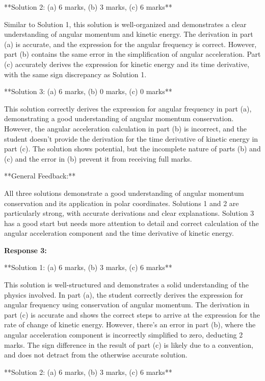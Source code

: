 \documentclass[a4paper,11pt]{article}
\begin{document}
**Solution 2: (a) 6 marks, (b) 3 marks, (c) 6 marks**

Similar to Solution 1, this solution is well-organized and demonstrates a clear understanding of angular momentum and kinetic energy. The derivation in part (a) is accurate, and the expression for the angular frequency is correct. However, part (b) contains the same error in the simplification of angular acceleration. Part (c) accurately derives the expression for kinetic energy and its time derivative, with the same sign discrepancy as Solution 1.

**Solution 3: (a) 6 marks, (b) 0 marks, (c) 0 marks**

This solution correctly derives the expression for angular frequency in part (a), demonstrating a good understanding of angular momentum conservation. However, the angular acceleration calculation in part (b) is incorrect, and the student doesn't provide the derivation for the time derivative of kinetic energy in part (c). The solution shows potential, but the incomplete nature of parts (b) and (c) and the error in (b) prevent it from receiving full marks.

**General Feedback:**

All three solutions demonstrate a good understanding of angular momentum conservation and its application in polar coordinates. Solutions 1 and 2 are particularly strong, with accurate derivations and clear explanations. Solution 3 has a good start but needs more attention to detail and correct calculation of the angular acceleration component and the time derivative of kinetic energy.

\bigskip    
\textbf{Response 3:}

**Solution 1: (a) 6 marks, (b) 3 marks, (c) 6 marks**

This solution is well-structured and demonstrates a solid understanding of the physics involved. In part (a), the student correctly derives the expression for angular frequency using conservation of angular momentum. The derivation in part (c) is accurate and shows the correct steps to arrive at the expression for the rate of change of kinetic energy. However, there's an error in part (b), where the angular acceleration component is incorrectly simplified to zero, deducting 2 marks. The sign difference in the result of part (c) is likely due to a convention, and does not detract from the otherwise accurate solution.

**Solution 2: (a) 6 marks, (b) 3 marks, (c) 6 marks**
\end{document}
